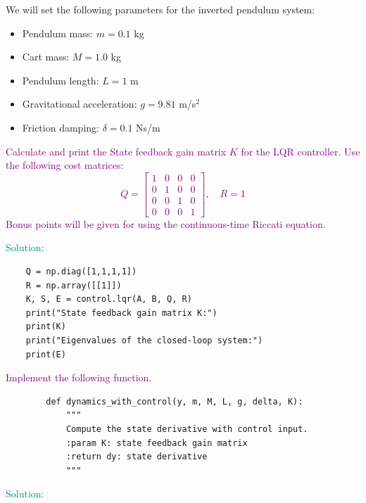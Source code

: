\documentclass[a4 paper]{article}
\begin{document}
We will set the following parameters for the inverted pendulum system:
\begin{itemize}
    \item Pendulum mass: \( m = 0.1 \) kg
    \item Cart mass: \( M = 1.0 \) kg
    \item Pendulum length: \( L = 1 \) m
    \item Gravitational acceleration: \( g = 9.81 \) m/s\(^2\)
    \item Friction damping: \( \delta = 0.1 \) Ns/m
\end{itemize}

\textcolor{purple}{
     Calculate and print the State feedback gain matrix \( K \) for the LQR controller. 
    Use the following cost matrices:
    \begin{equation*}
        Q = \begin{bmatrix}
            1 & 0 & 0 & 0 \\
            0 & 1 & 0 & 0 \\
            0 & 0 & 1 & 0 \\
            0 & 0 & 0 & 1
        \end{bmatrix}, \quad R = 1
    \end{equation*}
    Bonus points will be given for using the continuous-time Riccati equation.
}

\medbreak

\textcolor{teal}{
    Solution:
}

\begin{verbatim}
    Q = np.diag([1,1,1,1])
    R = np.array([[1]])
    K, S, E = control.lqr(A, B, Q, R)
    print("State feedback gain matrix K:")
    print(K)
    print("Eigenvalues of the closed-loop system:")
    print(E)
\end{verbatim}

\bigbreak

\textcolor{purple}{
     Implement the following function.
}
    \begin{verbatim}
        def dynamics_with_control(y, m, M, L, g, delta, K):
            """
            Compute the state derivative with control input.
            :param K: state feedback gain matrix
            :return dy: state derivative
            """
    \end{verbatim}


\medbreak

\textcolor{teal}{
    Solution:
}
\end{document}
